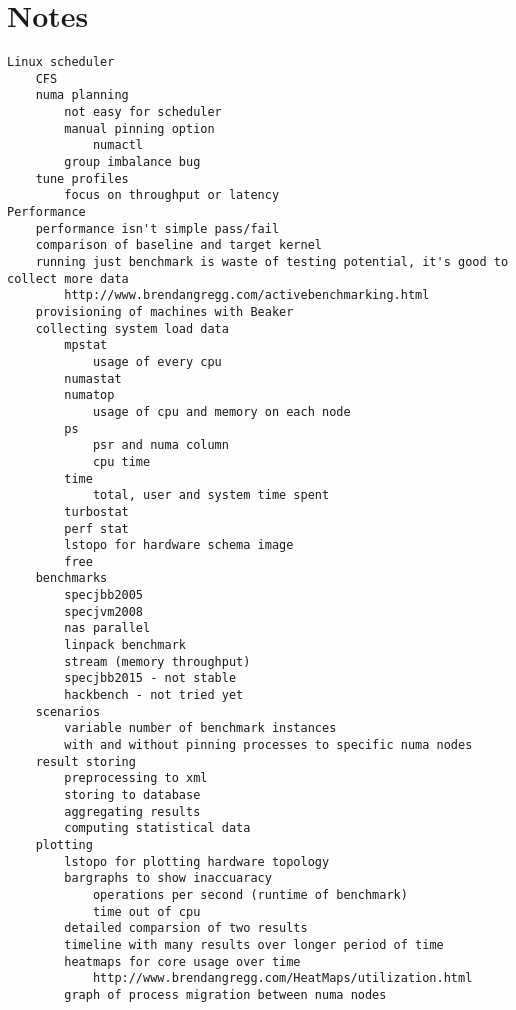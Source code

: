 \chapter{Notes}
\begin{verbatim}
Linux scheduler
    CFS
    numa planning
        not easy for scheduler
        manual pinning option
            numactl
        group imbalance bug
    tune profiles
        focus on throughput or latency
Performance
    performance isn't simple pass/fail
    comparison of baseline and target kernel
    running just benchmark is waste of testing potential, it's good to collect more data
        http://www.brendangregg.com/activebenchmarking.html
    provisioning of machines with Beaker
    collecting system load data
        mpstat
            usage of every cpu
        numastat
        numatop
            usage of cpu and memory on each node
        ps
            psr and numa column
            cpu time
        time
            total, user and system time spent
        turbostat
        perf stat
        lstopo for hardware schema image
        free
    benchmarks
        specjbb2005
        specjvm2008
        nas parallel
        linpack benchmark
        stream (memory throughput)
        specjbb2015 - not stable
        hackbench - not tried yet
    scenarios
        variable number of benchmark instances
        with and without pinning processes to specific numa nodes
    result storing
        preprocessing to xml
        storing to database
        aggregating results
        computing statistical data
    plotting
        lstopo for plotting hardware topology
        bargraphs to show inaccuaracy
            operations per second (runtime of benchmark)
            time out of cpu
        detailed comparsion of two results
        timeline with many results over longer period of time
        heatmaps for core usage over time
            http://www.brendangregg.com/HeatMaps/utilization.html
        graph of process migration between numa nodes
\end{verbatim}

